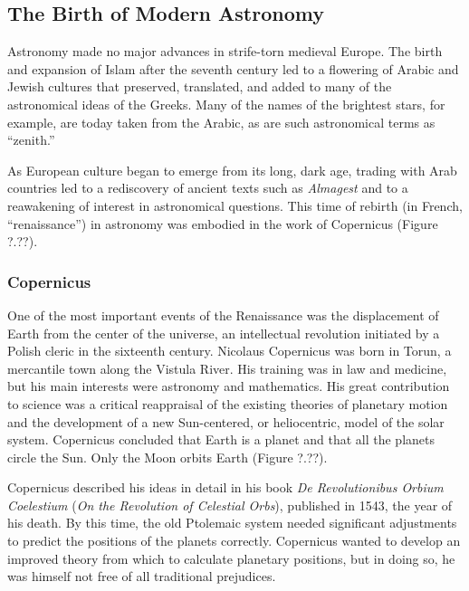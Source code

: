 \documentclass[main.tex]{subfiles}
\begin{document}
\subsection{The Birth of Modern Astronomy}

Astronomy made no major advances in strife-torn medieval Europe. The birth and expansion of Islam after the seventh century led to a flowering of Arabic and Jewish cultures that preserved, translated, and added to many of the astronomical ideas of the Greeks. Many of the names of the brightest stars, for example, are today taken from the Arabic, as are such astronomical terms as ``zenith.''

\vspace{1em}

As European culture began to emerge from its long, dark age, trading with Arab countries led to a rediscovery of ancient texts such as \textit{Almagest} and to a reawakening of interest in astronomical questions. This time of rebirth (in French, ``renaissance'') in astronomy was embodied in the work of Copernicus (Figure ?.??).

\vspace{1em}


\subsubsection*{Copernicus}

One of the most important events of the Renaissance was the displacement of Earth from the center of the universe, an intellectual revolution initiated by a Polish cleric in the sixteenth century. Nicolaus Copernicus was born in Torun, a mercantile town along the Vistula River. His training was in law and medicine, but his main interests were astronomy and mathematics. His great contribution to science was a critical reappraisal of the existing theories of planetary motion and the development of a new Sun-centered, or \gls{heliocentric}, model of the solar system. Copernicus concluded that Earth is a planet and that all the planets circle the Sun. Only the Moon orbits Earth (Figure ?.??).

\vspace{1em}


Copernicus described his ideas in detail in his book \textit{De Revolutionibus Orbium Coelestium} (\textit{On the Revolution of Celestial Orbs}), published in 1543, the year of his death. By this time, the old Ptolemaic system needed significant adjustments to predict the positions of the planets correctly. Copernicus wanted to develop an improved theory from which to calculate planetary positions, but in doing so, he was himself not free of all traditional prejudices.
\end{document}
